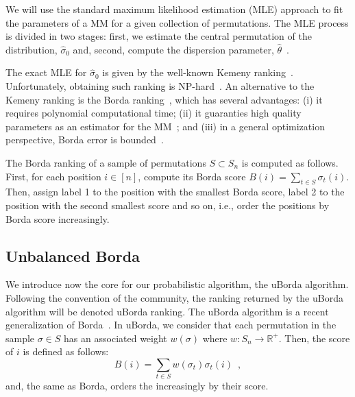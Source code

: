 \documentclass[runningheads]{llncs}
\begin{document}
We will use the standard maximum likelihood estimation (MLE) approach to fit the parameters of a MM for a given collection of permutations. 
The MLE process is divided in two stages: first, we estimate the central permutation of the distribution, $\hat{\sigma}_0$ and, second, compute the dispersion parameter, $\hat\theta$~\cite{IruCalLoz2016permallows}. 

The exact MLE for $\hat\sigma_0$ is given by the well-known Kemeny ranking~\cite{DwoKumNao2001rank}. Unfortunately,  obtaining such ranking is NP-hard~\cite{DwoKumNao2001rank}. An alternative to the Kemeny ranking is the Borda ranking~\cite{AliMei2011kemeny}, which has several advantages: (i) it requires polynomial computational time; (ii) it  guaranties  high quality parameters as an estimator for the MM~\cite{CarProSha2013votes}; and (iii) in a general optimization perspective, Borda error is bounded~\cite{CopFleRur2010ordering}.

The Borda ranking of a sample of permutations $S \subset S_n$ is computed as follows. 
First, for each position $i \in [n]$, compute its Borda score $B(i) =  \sum_{t\in S}  \sigma_t(i)$. Then, assign label 1 to the position with the smallest Borda score, label 2 to the position with the second smallest score and so on, i.e., order the positions by Borda score increasingly.

\subsection{Unbalanced Borda}\label{sec:uborda}
We introduce now the core for our probabilistic algorithm, the uBorda algorithm. Following the convention of the community, the ranking returned by the uBorda algorithm will be denoted uBorda ranking. The uBorda algorithm is a recent generalization of Borda~\cite{???}. In uBorda, we consider that each permutation in the sample $\sigma\in S$ has an associated weight $w(\sigma)$ where $w\colon S_n \to \mathbb{R^{+}}$. Then, the score of  $i$ is defined as follows:
%
\begin{equation}\label{eq:uborda_score}
B(i) =  \sum_{t\in S}  w(\sigma_t) \sigma_t(i) \enspace,
\end{equation}
%
and, the same as Borda, orders the  increasingly by their score.
\end{document}
